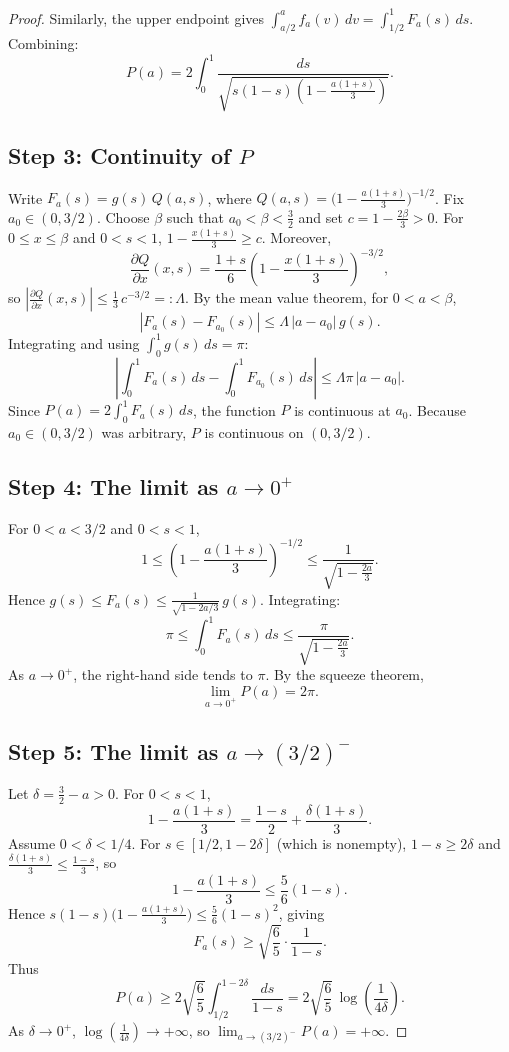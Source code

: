\begin{proof}
Similarly, the upper endpoint gives $\int_{a/2}^a f_a(v)\,dv = \int_{1/2}^1 F_a(s)\,ds$. Combining:
\[
P(a) = 2\int_0^1 \frac{ds}{\sqrt{s(1-s)\!\left(1 - \frac{a(1+s)}{3}\right)}}.
\]

\subsection*{Step 3: Continuity of $P$}

Write $F_a(s) = g(s)\,Q(a,s)$, where $Q(a,s) = \bigl(1 - \frac{a(1+s)}{3}\bigr)^{-1/2}$. Fix $a_0 \in (0,3/2)$. Choose $\beta$ such that $a_0 < \beta < \frac{3}{2}$ and set $c = 1 - \frac{2\beta}{3} > 0$. For $0 \le x \le \beta$ and $0 < s < 1$, $1 - \frac{x(1+s)}{3} \ge c$. Moreover,
\[
\frac{\partial Q}{\partial x}(x,s) = \frac{1+s}{6}\left(1 - \frac{x(1+s)}{3}\right)^{-3/2},
\]
so $\left|\frac{\partial Q}{\partial x}(x,s)\right| \le \frac{1}{3}\,c^{-3/2} =: \Lambda$. By the mean value theorem, for $0 < a < \beta$,
\[
|F_a(s) - F_{a_0}(s)| \le \Lambda\,|a - a_0|\,g(s).
\]
Integrating and using $\int_0^1 g(s)\,ds = \pi$:
\[
\left|\int_0^1 F_a(s)\,ds - \int_0^1 F_{a_0}(s)\,ds\right| \le \Lambda\pi\,|a - a_0|.
\]
Since $P(a) = 2\int_0^1 F_a(s)\,ds$, the function $P$ is continuous at $a_0$. Because $a_0 \in (0,3/2)$ was arbitrary, $P$ is continuous on $(0,3/2)$.

\subsection*{Step 4: The limit as $a \to 0^+$}

For $0 < a < 3/2$ and $0 < s < 1$,
\[
1 \le \left(1 - \frac{a(1+s)}{3}\right)^{-1/2} \le \frac{1}{\sqrt{1 - \frac{2a}{3}}}.
\]
Hence $g(s) \le F_a(s) \le \frac{1}{\sqrt{1 - 2a/3}}\,g(s)$. Integrating:
\[
\pi \le \int_0^1 F_a(s)\,ds \le \frac{\pi}{\sqrt{1 - \frac{2a}{3}}}.
\]
As $a \to 0^+$, the right-hand side tends to $\pi$. By the squeeze theorem,
\[
\lim_{a \to 0^+} P(a) = 2\pi.
\]

\subsection*{Step 5: The limit as $a \to (3/2)^-$}

Let $\delta = \frac{3}{2} - a > 0$. For $0 < s < 1$,
\[
1 - \frac{a(1+s)}{3} = \frac{1-s}{2} + \frac{\delta(1+s)}{3}.
\]
Assume $0 < \delta < 1/4$. For $s \in [1/2, 1-2\delta]$ (which is nonempty), $1-s \ge 2\delta$ and $\frac{\delta(1+s)}{3} \le \frac{1-s}{3}$, so
\[
1 - \frac{a(1+s)}{3} \le \frac{5}{6}(1-s).
\]
Hence $s(1-s)\bigl(1 - \frac{a(1+s)}{3}\bigr) \le \frac{5}{6}(1-s)^2$, giving
\[
F_a(s) \ge \sqrt{\frac{6}{5}} \cdot \frac{1}{1-s}.
\]
Thus
\[
P(a) \ge 2\sqrt{\frac{6}{5}} \int_{1/2}^{1-2\delta} \frac{ds}{1-s} = 2\sqrt{\frac{6}{5}}\,\log\!\left(\frac{1}{4\delta}\right).
\]
As $\delta \to 0^+$, $\log\!\left(\frac{1}{4\delta}\right) \to +\infty$, so $\lim_{a \to (3/2)^-} P(a) = +\infty$.


\end{proof}
